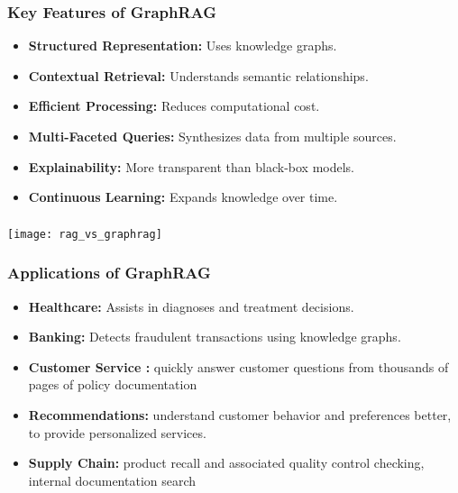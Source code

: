 \begin{frame}[fragile]\frametitle{Key Features of GraphRAG}
    \begin{itemize}
        \item \textbf{Structured Representation:} Uses knowledge graphs.
        \item \textbf{Contextual Retrieval:} Understands semantic relationships.
        \item \textbf{Efficient Processing:} Reduces computational cost.
        \item \textbf{Multi-Faceted Queries:} Synthesizes data from multiple sources.
        \item \textbf{Explainability:} More transparent than black-box models.
        \item \textbf{Continuous Learning:} Expands knowledge over time.
    \end{itemize}
\end{frame}

\begin{frame}[fragile]\frametitle{}

	\begin{center}
	\texttt{[image: rag\_vs\_graphrag]}
	\end{center}
	
\end{frame}


\begin{frame}[fragile]\frametitle{Applications of GraphRAG}
    \begin{itemize}
        \item \textbf{Healthcare:} Assists in diagnoses and treatment decisions.
        \item \textbf{Banking:} Detects fraudulent transactions using knowledge graphs.
        \item \textbf{Customer Service :} quickly answer customer questions from thousands of pages of policy documentation
        \item \textbf{Recommendations:} understand customer behavior and preferences better, to provide personalized services.
        \item \textbf{Supply Chain:} product recall and associated quality control checking, internal documentation search
	
    \end{itemize}

\end{frame}

